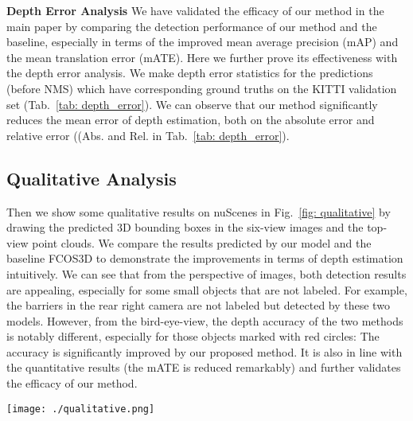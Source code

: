 \noindent\textbf{Depth Error Analysis}\quad
We have validated the efficacy of our method in the main paper by comparing the detection performance of our method and the baseline, especially in terms of the improved mean average precision (mAP) and the mean translation error (mATE). Here we further prove its effectiveness with the depth error analysis. We make depth error statistics for the predictions (before NMS) which have corresponding ground truths on the KITTI validation set (Tab.~\ref{tab: depth_error}). We can observe that our method significantly reduces the mean error of depth estimation, both on the absolute error and relative error ((Abs. and Rel. in Tab.~\ref{tab: depth_error}).

\subsection{Qualitative Analysis}
Then we show some qualitative results on nuScenes in Fig.~\ref{fig: qualitative} by drawing the predicted 3D bounding boxes in the six-view images and the top-view point clouds. We compare the results predicted by our model and the baseline FCOS3D to demonstrate the improvements in terms of depth estimation intuitively.
We can see that from the perspective of images, both detection results are appealing, especially for some small objects that are not labeled. For example, the barriers in the rear right camera are not labeled but detected by these two models.
However, from the bird-eye-view, the depth accuracy of the two methods is notably different, especially for those objects marked with red circles: The accuracy is significantly improved by our proposed method. It is also in line with the quantitative results (the mATE is reduced remarkably) and further validates the efficacy of our method.

\begin{figure*}
\begin{center}
\texttt{[image: ./qualitative.png]}
\end{center}
   \vspace{-2ex}
   \caption{Qualitative analysis of detection results. 3D bounding box predictions are projected onto images from six different views and bird-view, respectively. Boxes from different categories are marked with different colors. We can see that the detection results of FCOS3D and PGD are both reasonable. However, from the bird-eye-view, the depth accuracy is remarkably improved by our method, especially for those objects marked with red circles.}
   \vspace{-2.5ex}
\label{fig: qualitative}
\end{figure*}

\label{sec:appendix}